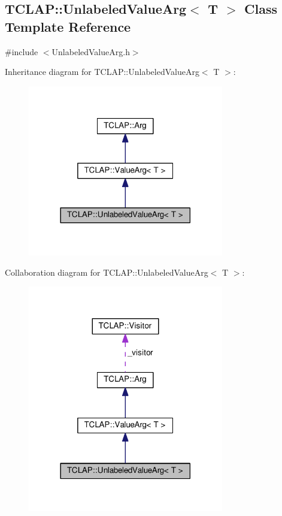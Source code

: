 \hypertarget{classTCLAP_1_1UnlabeledValueArg}{}\subsection{T\+C\+L\+AP\+:\+:Unlabeled\+Value\+Arg$<$ T $>$ Class Template Reference}
\label{classTCLAP_1_1UnlabeledValueArg}


{\ttfamily \#include $<$Unlabeled\+Value\+Arg.\+h$>$}



Inheritance diagram for T\+C\+L\+AP\+:\+:Unlabeled\+Value\+Arg$<$ T $>$\+:
\nopagebreak
\begin{figure}[H]
\begin{center}
\leavevmode
\includegraphics[width=242pt]{classTCLAP_1_1UnlabeledValueArg__inherit__graph}
\end{center}
\end{figure}


Collaboration diagram for T\+C\+L\+AP\+:\+:Unlabeled\+Value\+Arg$<$ T $>$\+:
\nopagebreak
\begin{figure}[H]
\begin{center}
\leavevmode
\includegraphics[width=242pt]{classTCLAP_1_1UnlabeledValueArg__coll__graph}
\end{center}
\end{figure}

